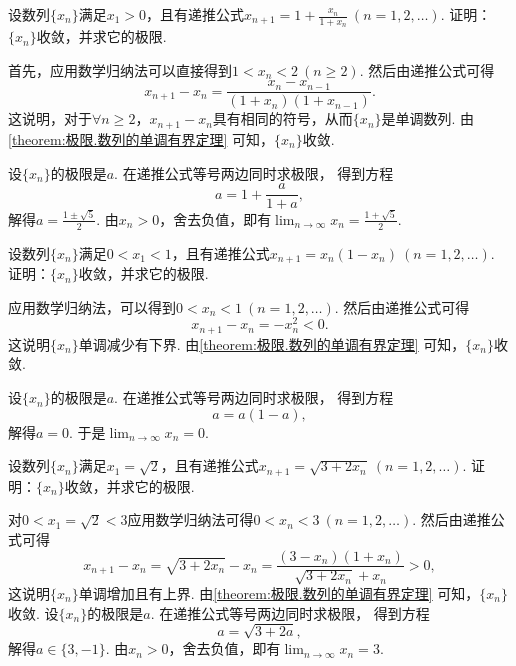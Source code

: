 \begin{example}
设数列\(\{x_n\}\)满足\(x_1>0\)，且有递推公式\(x_{n+1}=1+\frac{x_n}{1+x_n}\ (n=1,2,\dotsc)\).
证明：\(\{x_n\}\)收敛，并求它的极限.
\begin{solution}
首先，应用数学归纳法可以直接得到\(1<x_n<2\ (n\geq2)\).
然后由递推公式可得\begin{equation*}
	x_{n+1}-x_n = \frac{x_n-x_{n-1}}{(1+x_n)(1+x_{n-1})}.
\end{equation*}
这说明，对于\(\forall n\geq2\)，\(x_{n+1}-x_n\)具有相同的符号，从而\(\{x_n\}\)是单调数列.
由\cref{theorem:极限.数列的单调有界定理} 可知，\(\{x_n\}\)收敛.

设\(\{x_n\}\)的极限是\(a\).
在递推公式等号两边同时求极限，
得到方程\begin{equation*}
	a = 1 + \frac{a}{1+a},
\end{equation*}
解得\(a = \frac{1\pm\sqrt5}2\).
由\(x_n>0\)，舍去负值，即有\(\lim_{n\to\infty} x_n = \frac{1+\sqrt5}2\).
\end{solution}
\end{example}

\begin{example}
设数列\(\{x_n\}\)满足\(0<x_1<1\)，且有递推公式\(x_{n+1}=x_n(1-x_n)\ (n=1,2,\dotsc)\).
证明：\(\{x_n\}\)收敛，并求它的极限.
\begin{solution}
应用数学归纳法，可以得到\(0<x_n<1\ (n=1,2,\dotsc)\).
然后由递推公式可得\begin{equation*}
	x_{n+1}-x_n = -x_n^2 < 0.
\end{equation*}
这说明\(\{x_n\}\)单调减少有下界.
由\cref{theorem:极限.数列的单调有界定理} 可知，\(\{x_n\}\)收敛.

设\(\{x_n\}\)的极限是\(a\).
在递推公式等号两边同时求极限，
得到方程\begin{equation*}
	a=a(1-a),
\end{equation*}
解得\(a=0\).
于是\(\lim_{n\to\infty} x_n = 0\).
\end{solution}
\end{example}

\begin{example}
设数列\(\{x_n\}\)满足\(x_1=\sqrt2\)，且有递推公式\(x_{n+1}=\sqrt{3+2x_n}\ (n=1,2,\dotsc)\).
证明：\(\{x_n\}\)收敛，并求它的极限.
\begin{solution}
对\(0<x_1=\sqrt2<3\)应用数学归纳法可得\(0<x_n<3\ (n=1,2,\dotsc)\).
然后由递推公式可得\begin{equation*}
	x_{n+1}-x_n = \sqrt{3+2x_n} - x_n
	= \frac{(3-x_n)(1+x_n)}{\sqrt{3+2x_n}+x_n}
	> 0,
\end{equation*}
这说明\(\{x_n\}\)单调增加且有上界.
由\cref{theorem:极限.数列的单调有界定理} 可知，\(\{x_n\}\)收敛.
设\(\{x_n\}\)的极限是\(a\).
在递推公式等号两边同时求极限，
得到方程\begin{equation*}
	a=\sqrt{3+2a},
\end{equation*}
解得\(a\in\{3,-1\}\).
由\(x_n>0\)，舍去负值，即有\(\lim_{n\to\infty} x_n = 3\).
\end{solution}
\end{example}


